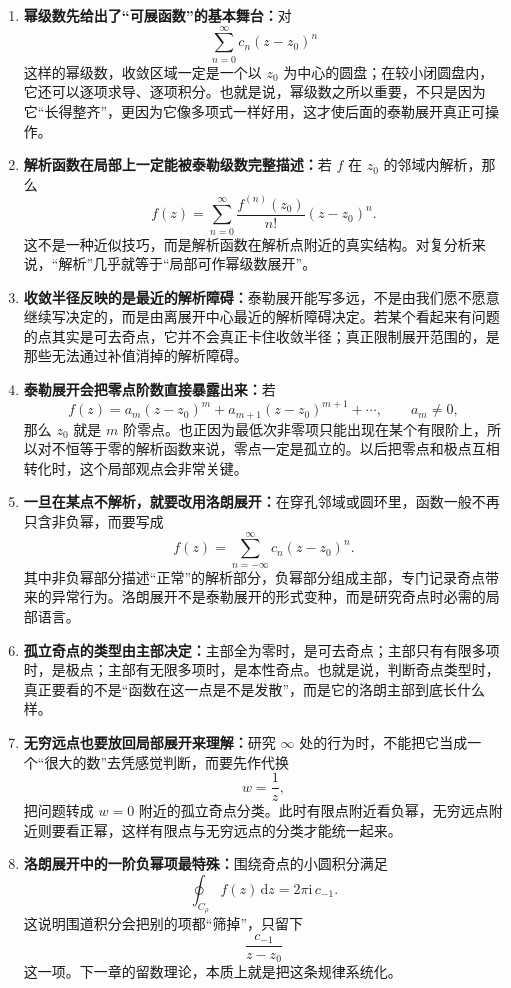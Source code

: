 \begin{zhongyao}[本章主要结论]
\raggedright
\begin{enumerate}
    \item \textbf{幂级数先给出了``可展函数''的基本舞台：}对
    \[
        \sum_{n=0}^{\infty} c_n (z-z_0)^n
    \]
    这样的幂级数，收敛区域一定是一个以 $z_0$ 为中心的圆盘；在较小闭圆盘内，它还可以逐项求导、逐项积分。也就是说，幂级数之所以重要，不只是因为它``长得整齐''，更因为它像多项式一样好用，这才使后面的泰勒展开真正可操作。

    \item \textbf{解析函数在局部上一定能被泰勒级数完整描述：}若 $f$ 在 $z_0$ 的邻域内解析，那么
    \[
        f(z)=\sum_{n=0}^{\infty}\frac{f^{(n)}(z_0)}{n!}(z-z_0)^n.
    \]
    这不是一种近似技巧，而是解析函数在解析点附近的真实结构。对复分析来说，``解析''几乎就等于``局部可作幂级数展开''。

    \item \textbf{收敛半径反映的是最近的解析障碍：}泰勒展开能写多远，不是由我们愿不愿意继续写决定的，而是由离展开中心最近的解析障碍决定。若某个看起来有问题的点其实是可去奇点，它并不会真正卡住收敛半径；真正限制展开范围的，是那些无法通过补值消掉的解析障碍。

    \item \textbf{泰勒展开会把零点阶数直接暴露出来：}若
    \[
        f(z)=a_m(z-z_0)^m+a_{m+1}(z-z_0)^{m+1}+\cdots,\qquad a_m\ne 0,
    \]
    那么 $z_0$ 就是 $m$ 阶零点。也正因为最低次非零项只能出现在某个有限阶上，所以对不恒等于零的解析函数来说，零点一定是孤立的。以后把零点和极点互相转化时，这个局部观点会非常关键。

    \item \textbf{一旦在某点不解析，就要改用洛朗展开：}在穿孔邻域或圆环里，函数一般不再只含非负幂，而要写成
    \[
        f(z)=\sum_{n=-\infty}^{\infty} c_n (z-z_0)^n.
    \]
    其中非负幂部分描述``正常''的解析部分，负幂部分组成主部，专门记录奇点带来的异常行为。洛朗展开不是泰勒展开的形式变种，而是研究奇点时必需的局部语言。

    \item \textbf{孤立奇点的类型由主部决定：}主部全为零时，是可去奇点；主部只有有限多项时，是极点；主部有无限多项时，是本性奇点。也就是说，判断奇点类型时，真正要看的不是``函数在这一点是不是发散''，而是它的洛朗主部到底长什么样。

    \item \textbf{无穷远点也要放回局部展开来理解：}研究 $\infty$ 处的行为时，不能把它当成一个``很大的数''去凭感觉判断，而要先作代换
    \[
        w=\frac{1}{z},
    \]
    把问题转成 $w=0$ 附近的孤立奇点分类。此时有限点附近看负幂，无穷远点附近则要看正幂，这样有限点与无穷远点的分类才能统一起来。

    \item \textbf{洛朗展开中的一阶负幂项最特殊：}围绕奇点的小圆积分满足
    \[
        \oint_{C_\rho} f(z)\,\mathrm{d}z = 2\pi \mathrm{i}\,c_{-1}.
    \]
    这说明围道积分会把别的项都``筛掉''，只留下
    \[
        \frac{c_{-1}}{z-z_0}
    \]
    这一项。下一章的留数理论，本质上就是把这条规律系统化。
\end{enumerate}
\end{zhongyao}

